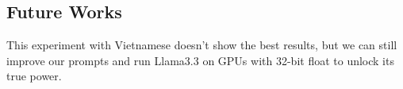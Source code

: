 \documentclass[12pt]{article}
\begin{document}
\subsection*{Future Works}
This experiment with Vietnamese doesn't show the best results, but we can still improve our prompts and run Llama3.3 on GPUs with 32-bit float to unlock its true power.
\end{document}
